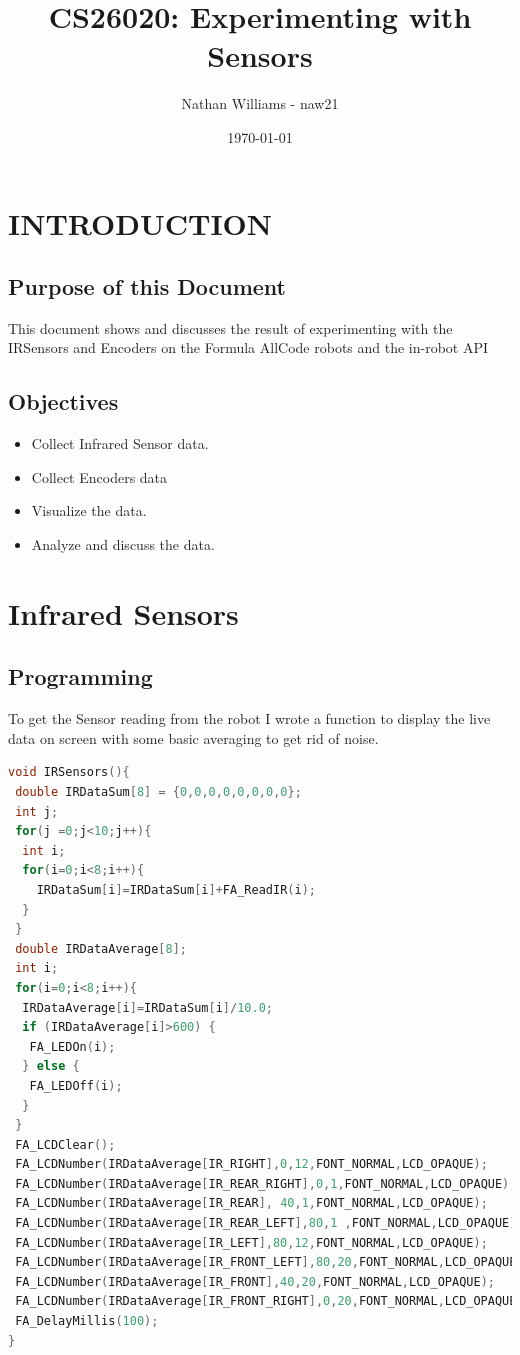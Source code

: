 \documentclass[11pt,a4paper,titlepage]{article}
\title{CS26020: Experimenting with Sensors}
\author{Nathan Williams - naw21}
\date{\today}
\begin{document}
\maketitle
\tableofcontents
\listoffigures
\newpage
\section{INTRODUCTION}

\subsection{Purpose of this Document}

This document shows and discusses the result of experimenting with the IRSensors and Encoders on the Formula AllCode robots\cite{Formula all-code} and the in-robot API\cite{in-robot api}

\subsection{Objectives}
	
\begin{itemize}
	\item Collect Infrared Sensor data.
	\item Collect Encoders data
	\item Visualize the data.
	\item Analyze and discuss the data.
\end{itemize}

\section{Infrared Sensors}
\subsection{Programming}
To get the Sensor reading from the robot I wrote a function to display the live data on screen with some basic averaging to get rid of noise.
\begin{lstlisting}[language=C,frame=single]
void IRSensors(){
 double IRDataSum[8] = {0,0,0,0,0,0,0,0};
 int j;
 for(j =0;j<10;j++){
  int i;
  for(i=0;i<8;i++){
	IRDataSum[i]=IRDataSum[i]+FA_ReadIR(i);	
  }
 }
 double IRDataAverage[8];
 int i;
 for(i=0;i<8;i++){
  IRDataAverage[i]=IRDataSum[i]/10.0;
  if (IRDataAverage[i]>600) {
   FA_LEDOn(i);
  } else {
   FA_LEDOff(i);
  }
 }
 FA_LCDClear();
 FA_LCDNumber(IRDataAverage[IR_RIGHT],0,12,FONT_NORMAL,LCD_OPAQUE);
 FA_LCDNumber(IRDataAverage[IR_REAR_RIGHT],0,1,FONT_NORMAL,LCD_OPAQUE);
 FA_LCDNumber(IRDataAverage[IR_REAR], 40,1,FONT_NORMAL,LCD_OPAQUE);
 FA_LCDNumber(IRDataAverage[IR_REAR_LEFT],80,1 ,FONT_NORMAL,LCD_OPAQUE);
 FA_LCDNumber(IRDataAverage[IR_LEFT],80,12,FONT_NORMAL,LCD_OPAQUE);
 FA_LCDNumber(IRDataAverage[IR_FRONT_LEFT],80,20,FONT_NORMAL,LCD_OPAQUE);
 FA_LCDNumber(IRDataAverage[IR_FRONT],40,20,FONT_NORMAL,LCD_OPAQUE);
 FA_LCDNumber(IRDataAverage[IR_FRONT_RIGHT],0,20,FONT_NORMAL,LCD_OPAQUE);
 FA_DelayMillis(100);
}

\end{lstlisting}
\end{document}
